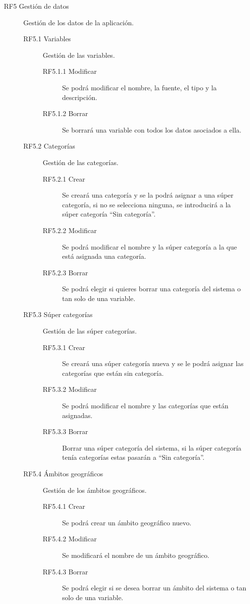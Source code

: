 \begin{description}
    \item [RF5 Gestión de datos] Gestión de los datos de la aplicación.
    \begin{description}
        \item [RF5.1 Variables] Gestión de las variables.
        \begin{description}
            \item [RF5.1.1 Modificar] Se podrá modificar el nombre, la fuente, el tipo y la descripción.
            \item [RF5.1.2 Borrar] Se borrará una variable con todos los datos asociados a ella.
        \end{description}
        \item [RF5.2 Categorías] Gestión de las categorías.
        \begin{description}
            \item [RF5.2.1 Crear] Se creará una categoría y se la podrá asignar a una súper categoría, si no se selecciona ninguna, se introducirá a la súper categoría “Sin categoría”.
            \item [RF5.2.2 Modificar] Se podrá modificar el nombre y la súper categoría a la que está asignada una categoría.
            \item [RF5.2.3 Borrar]  Se podrá elegir si quieres borrar una categoría del sistema o tan solo de una variable.
        \end{description}
        \item [RF5.3 Súper categorías] Gestión de las súper categorías.
        \begin{description}
            \item [RF5.3.1 Crear] Se creará una súper categoría nueva y se le podrá asignar las categorías que están sin categoría.
            \item [RF5.3.2 Modificar] Se podrá modificar el nombre y las categorías que están asignadas.
            \item [RF5.3.3 Borrar] Borrar una súper categoría del sistema, si la súper categoría tenía categorías estas pasarán a “Sin categoría”.
        \end{description}
        \item [RF5.4 Ámbitos geográficos] Gestión de los ámbitos geográficos.
        \begin{description}
            \item [RF5.4.1 Crear] Se podrá crear un ámbito geográfico nuevo.
            \item [RF5.4.2 Modificar] Se modificará el nombre de un ámbito geográfico.
            \item [RF5.4.3 Borrar] Se podrá elegir si se desea borrar un ámbito del sistema o tan solo de una variable.
        \end{description}
    \end{description}

\end{description}
